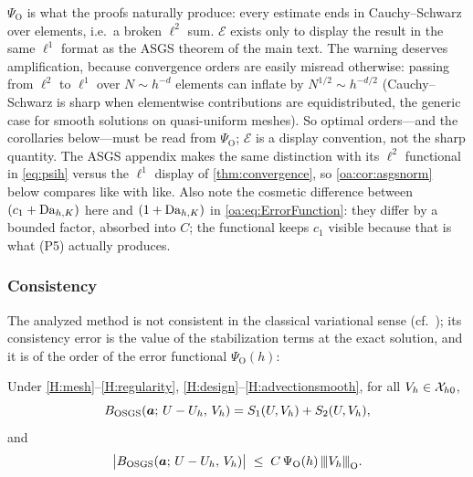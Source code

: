 \begin{pedagogy}
$\Psi_{\mathrm O}$ is what the proofs naturally produce: every estimate ends in
Cauchy--Schwarz over elements, i.e.\ a broken $\ell^2$ sum. $\mathcal E$ exists
only to display the result in the same $\ell^1$ format as the ASGS theorem of
the main text. The warning deserves amplification, because convergence orders
are easily misread otherwise: passing from $\ell^2$ to $\ell^1$ over
$N \sim h^{-d}$ elements can inflate by $N^{1/2} \sim h^{-d/2}$
(Cauchy--Schwarz is sharp when elementwise contributions are equidistributed,
the generic case for smooth solutions on quasi-uniform meshes). So optimal
orders---and the corollaries below---must be read from $\Psi_{\mathrm O}$;
$\mathcal E$ is a display convention, not the sharp quantity. The ASGS appendix
makes the same distinction with its $\ell^2$ functional in \cref{eq:psih}
versus the $\ell^1$ display of \cref{thm:convergence}, so
\cref{oa:cor:asgsnorm} below compares like with like. Also note the cosmetic
difference between $(c_1+\mathrm{Da}_{h,K})$ here and $(1+\mathrm{Da}_{h,K})$ in
\cref{oa:eq:ErrorFunction}: they differ by a bounded factor, absorbed into $C$;
the functional keeps $c_1$ visible because that is what (P5) actually
produces.
\end{pedagogy}

\subsubsection{Consistency}

The analyzed method is not consistent in the classical variational sense
(cf.~\cite[Eq.~(44)]{codina2008analysis}); its consistency error is the value of the
stabilization terms at the exact solution, and it is of the order of the error
functional $\Psi_{\mathrm O}(h)$:

\begin{lemma}
\label{oa:lem:consistency}
Under \cref{H:mesh}--\cref{H:regularity}, \cref{H:design}--\cref{H:advectionsmooth}, for all $V_h \in \mathcal{X}_{h0}$,
\begin{equation}
  \label{oa:eq:ConsistencyId}
  B_{\mathrm{OSGS}}(\boldsymbol{a};\, U - U_h,\, V_h)
  = S_1(U, V_h) + S_2(U, V_h),
\end{equation}
and
\begin{equation}
  \label{oa:eq:ConsistencyBound}
  \bigl| B_{\mathrm{OSGS}}(\boldsymbol{a};\, U - U_h,\, V_h) \bigr|
  \;\le\; C\,\Psi_{\mathrm O}(h)\,{\lvert\kern-0.25ex\lvert\kern-0.25ex\lvert V_h \rvert\kern-0.25ex\rvert\kern-0.25ex\rvert}_{\mathrm{O}}.
\end{equation}
\end{lemma}

